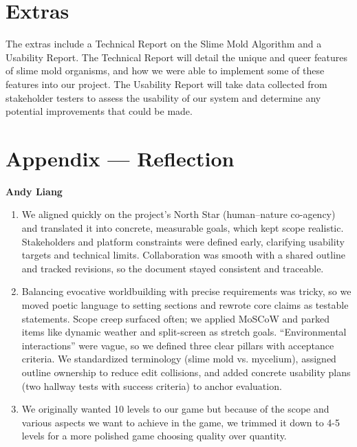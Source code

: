 \documentclass{article}
\begin{document}
\section{Extras}

The extras include a Technical Report on the Slime Mold Algorithm and a Usability Report.
The Technical Report will detail the unique and queer features of slime mold organisms, and
how we were able to implement some of these features into our project.
The Usability Report will take data collected from stakeholder testers to assess the
usability of our system and determine any potential improvements that could be made.

\newpage{}

\section*{Appendix --- Reflection}

\textbf{Andy Liang}
\begin{enumerate}
\item{We aligned quickly on the project’s North Star (human–nature co-agency) and translated it into concrete, measurable goals, which kept scope realistic. Stakeholders and platform constraints were defined early, clarifying usability targets and technical limits. Collaboration was smooth with a shared outline and tracked revisions, so the document stayed consistent and traceable.}
\item{Balancing evocative worldbuilding with precise requirements was tricky, so we moved poetic language to setting sections and rewrote core claims as testable statements. Scope creep surfaced often; we applied MoSCoW and parked items like dynamic weather and split-screen as stretch goals. “Environmental interactions” were vague, so we defined three clear pillars with acceptance criteria. We standardized terminology (slime mold vs. mycelium), assigned outline ownership to reduce edit collisions, and added concrete usability plans (two hallway tests with success criteria) to anchor evaluation.}
\item{We originally wanted 10 levels to our game but because of the scope and various aspects we want to achieve in the game, we trimmed it down to 4-5 levels for a more polished game choosing quality over quantity. }
\end{enumerate}
\end{document}
